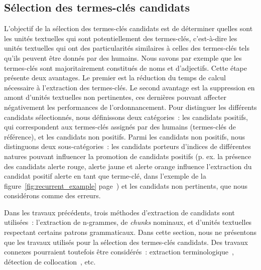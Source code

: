   \subsection{Sélection des termes-clés candidats}
  \label{subsec:extraction_de_termes_cles_candidats}
    L'objectif de la sélection des termes-clés candidats est de déterminer
    quelles
    sont les unités textuelles qui sont potentiellement des termes-clés,
    c'est-à-dire les unités textuelles qui ont des particularités similaires à
    celles des termes-clés tels qu'ils peuvent être donnés par des humains. Nous
    savons par exemple que les termes-clés sont majoritairement constitués de
    noms et d'adjectifs. Cette étape présente deux avantages. Le premier est la
    réduction du temps de calcul nécessaire à l'extraction des  termes-clés. Le
    second avantage est la suppression en amont d'unités  textuelles non
    pertinentes, ces dernières pouvant affecter négativement les  performances
    de l'ordonnancement. Pour distinguer les différents candidats  sélectionnés,
    nous définissons deux catégories~: les candidats positifs, qui
    correspondent aux termes-clés assignés par des humains (termes-clés de
    référence), et les candidats non positifs. Parmi les candidats non positifs,
    nous distinguons deux sous-catégories~: les candidats porteurs d'indices de
    différentes natures pouvant influencer la promotion de candidats positifs
    (p. ex. la présence des candidats \og{}alerte rouge\fg{}, \og{}alerte
    jaune\fg{} et \og{}alerte orange\fg{} influence l'extraction du candidat
    positif \og{}alerte\fg{} en tant que terme-clé, dans l'exemple de la
    figure~\ref{fig:recurrent_example} page~\pageref{fig:recurrent_example}) et
    les candidats non pertinents, que nous considérons comme des erreurs.

    Dans les travaux précédents, trois méthodes d'extraction de candidats sont
    utilisées~: l'extraction de n-grammes, de \textit{chunks} nominaux, et d'unités
    textuelles respectant certains patrons grammaticaux. Dans cette section,
    nous ne présentons que les travaux utilisés pour la sélection des
    termes-clés candidats. Des travaux connexes pourraient toutefois être
    considérés~: extraction
    terminologique~\cite{castellvi2001automatictermdetection}, détection de
    collocation~\cite{pearce2002collocationdetection}, etc.

